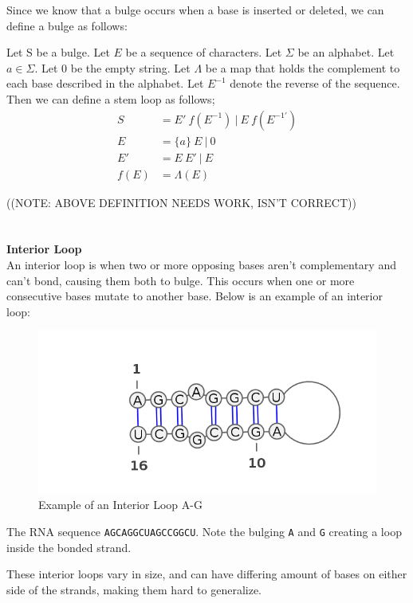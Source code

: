 Since we know that a bulge occurs when a base is inserted or deleted, we can 
define a bulge as follows:
\begin{mydef}\centering
Let S be a bulge. Let $E$ be a sequence of characters. Let $\Sigma$ be an alphabet. 
Let $a \in \Sigma$. Let $0$ be the empty string. Let $\Lambda$ be a map that holds the complement to each 
base described in the alphabet. Let $E^{-1}$ denote the reverse of the sequence. 
Then we can define a stem loop as follows;
\begin{align*}
S    &= E'~f(E^{-1})~|~E~f(E^{-1\prime})\\
E    &= \{a\}~E~|~0\\
E'   &= E~E'~|~E\\
f(E) &= \Lambda(E)
\end{align*}
\end{mydef}
((NOTE: ABOVE DEFINITION NEEDS WORK, ISN'T CORRECT))\\
\\\\
\textbf{Interior Loop}\\
An interior loop is when two or more opposing bases aren't complementary and 
can't bond, causing them both to bulge. This occurs when one or more 
consecutive bases mutate to another base. Below is an example of an interior 
loop:
\begin{myex}\centering
\begin{figure}[h!]
\centering
\includegraphics[scale=0.5]{./lib/interior-loop.png}
\caption{Example of an Interior Loop A-G}
\end{figure}
The RNA sequence {\tt AGCAGGCUAGCCGGCU}. Note the bulging {\tt A} and {\tt G} 
creating a loop inside the bonded strand.
\end{myex}
These interior loops vary in size, and can have differing amount of bases on 
either side of the strands, making them hard to generalize.\\
